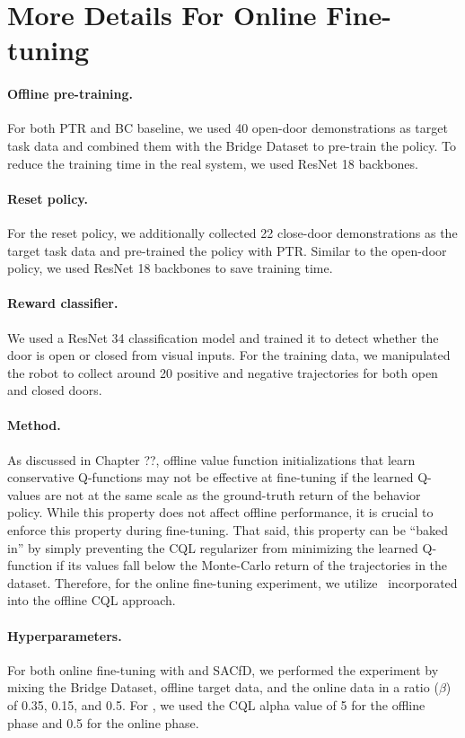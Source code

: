 \documentclass[../thesis.tex]{subfiles}
\begin{document}
\section{More Details For Online Fine-tuning}
\label{app:online_finetuning}

\paragraph{Offline pre-training.}
For both PTR and BC baseline, we used 40 open-door demonstrations as target task data and combined them with the Bridge Dataset to pre-train the policy. To reduce the training time in the real system, we used ResNet 18 backbones.

\paragraph{Reset policy.}
For the reset policy, we additionally collected 22 close-door demonstrations as the target task data and pre-trained the policy with PTR. Similar to the open-door policy, we used ResNet 18 backbones to save training time.

\paragraph{Reward classifier.} We used a ResNet 34 classification model and trained it to detect whether the door is open or closed from visual inputs. For the training data, we manipulated the robot to collect around 20 positive and negative trajectories for both open and closed doors.

\paragraph{Method.} As discussed in Chapter ??, offline value function initializations that learn conservative Q-functions may not be effective at fine-tuning if the learned Q-values are not at the same scale as the ground-truth return of the behavior policy. While this property does not affect offline performance, it is crucial to enforce this property during fine-tuning. That said, this property can be ``baked in'' by simply preventing the CQL regularizer from minimizing the learned Q-function if its values fall below the Monte-Carlo return of the trajectories in the dataset. Therefore, for the online fine-tuning experiment, we utilize \methodname\ incorporated into the offline CQL approach.

\paragraph{Hyperparameters.} 
For both online fine-tuning with \ptrmethodname and SACfD, we performed the experiment by mixing the Bridge Dataset, offline target data, and the online data in a ratio ($\beta$) of 0.35, 0.15, and 0.5. For \ptrmethodname, we used the CQL alpha value of 5 for the offline phase and 0.5 for the online phase. 
\end{document}
